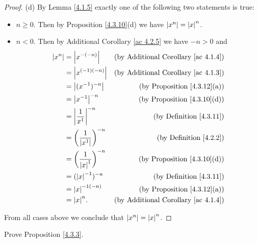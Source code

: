 \begin{proof}{(d)}
    By Lemma \ref{4.1.5} exactly one of the following two statements is true:
    \begin{itemize}
        \item \(n \geq 0\).
              Then by Proposition \ref{4.3.10}(d) we have \(\abs*{x^n} = \abs*{x}^n\).
        \item \(n < 0\).
              Then by Additional Corollary \ref{ac 4.2.5} we have \(-n > 0\) and
              \begin{align*}
                  \abs*{x^n} & = \abs*{x^{-(-n)}}                      & \text{(by Additional Corollary \ref{ac 4.1.4})} \\
                             & = \abs*{x^{(-1)(-n)}}                   & \text{(by Additional Corollary \ref{ac 4.1.3})} \\
                             & = \abs*{(x^{-1})^{-n}}                  & \text{(by Proposition \ref{4.3.12}(a))}         \\
                             & = \abs*{x^{-1}}^{-n}                    & \text{(by Proposition \ref{4.3.10}(d))}         \\
                             & = \abs*{\frac{1}{x^1}}^{-n}             & \text{(by Definition \ref{4.3.11})}             \\
                             & = \bigg(\frac{1}{\abs*{x^1}}\bigg)^{-n} & \text{(by Definition \ref{4.2.2})}              \\
                             & = \bigg(\frac{1}{\abs*{x}^1}\bigg)^{-n} & \text{(by Proposition \ref{4.3.10}(d))}         \\
                             & = (\abs*{x}^{-1})^{-n}                  & \text{(by Definition \ref{4.3.11})}             \\
                             & = \abs*{x}^{-1(-n)}                     & \text{(by Proposition \ref{4.3.12}(a))}         \\
                             & = \abs*{x}^n.                           & \text{(by Additional Corollary \ref{ac 4.1.4})}
              \end{align*}
    \end{itemize}
    From all cases above we conclude that \(\abs*{x^n} = \abs*{x}^n\).
\end{proof}

\exercisesection

\begin{exercise}\label{ex 4.3.1}
    Prove Proposition \ref{4.3.3}.
\end{exercise}

